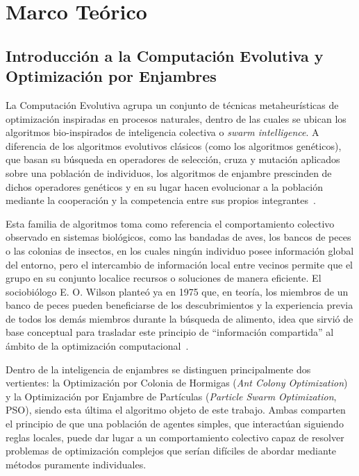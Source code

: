 \section{Marco Teórico}

\subsection{Introducción a la Computación Evolutiva y Optimización por Enjambres}

La Computación Evolutiva agrupa un conjunto de técnicas metaheurísticas de optimización inspiradas en procesos naturales, dentro de las cuales se ubican los algoritmos bio-inspirados de inteligencia colectiva o \textit{swarm intelligence}. A diferencia de los algoritmos evolutivos clásicos (como los algoritmos genéticos), que basan su búsqueda en operadores de selección, cruza y mutación aplicados sobre una población de individuos, los algoritmos de enjambre prescinden de dichos operadores genéticos y en su lugar hacen evolucionar a la población mediante la cooperación y la competencia entre sus propios integrantes~\cite{pereira_particle_2011}.

Esta familia de algoritmos toma como referencia el comportamiento colectivo observado en sistemas biológicos, como las bandadas de aves, los bancos de peces o las colonias de insectos, en los cuales ningún individuo posee información global del entorno, pero el intercambio de información local entre vecinos permite que el grupo en su conjunto localice recursos o soluciones de manera eficiente. El sociobiólogo E. O. Wilson planteó ya en 1975 que, en teoría, los miembros de un banco de peces pueden beneficiarse de los descubrimientos y la experiencia previa de todos los demás miembros durante la búsqueda de alimento, idea que sirvió de base conceptual para trasladar este principio de ``información compartida'' al ámbito de la optimización computacional~\cite{collet_stochastic_2007}.

Dentro de la inteligencia de enjambres se distinguen principalmente dos vertientes: la Optimización por Colonia de Hormigas (\textit{Ant Colony Optimization}) y la Optimización por Enjambre de Partículas (\textit{Particle Swarm Optimization}, PSO), siendo esta última el algoritmo objeto de este trabajo. Ambas comparten el principio de que una población de agentes simples, que interactúan siguiendo reglas locales, puede dar lugar a un comportamiento colectivo capaz de resolver problemas de optimización complejos que serían difíciles de abordar mediante métodos puramente individuales.

